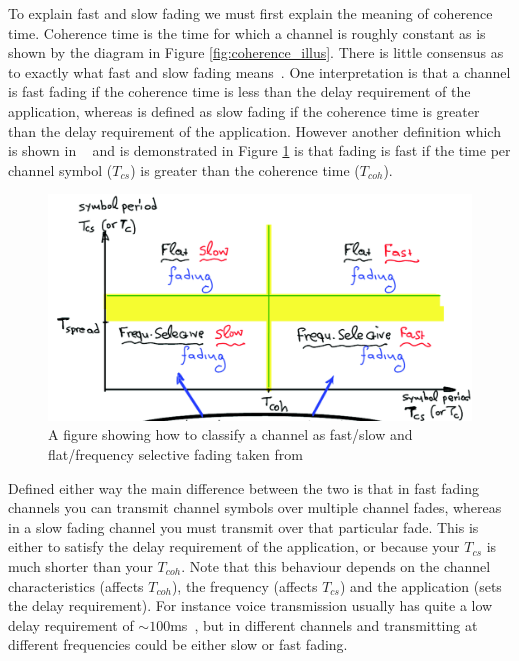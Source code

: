 \documentclass[12pt,onecolumn,letterpaper]{article}
\newcommand\genfigsize{0.5}
\begin{document}
To explain fast and slow fading we must first explain the meaning of coherence time. Coherence time is the time for which a channel is roughly constant as is shown by the diagram in Figure \ref{fig:coherence_illus}. There is little consensus as to exactly what fast and slow fading means~\cite{WirelessTextbookC2}. One interpretation is that a channel is fast fading if the coherence time is less than the delay requirement of the application, whereas is defined as slow fading if the coherence time is greater than the delay requirement of the application. However another definition which is shown in ~\cite{EE3CommsSystemsNotesL4} and is demonstrated in Figure \ref{fig:fast_slow_flat_freq_selec_fading} is that fading is fast if the time per channel symbol ($T_{cs}$) is greater than the coherence time ($T_{coh}$).

\begin{figure}[t]
   \centering
   \includegraphics[width=\genfigsize\linewidth]{figures/fast_slow_flat_freq_selec_fading.PNG}
   \caption{A figure showing how to classify a channel as fast/slow and flat/frequency selective fading taken from~\cite{EE3CommsSystemsNotesL4}}
\label{fig:fast_slow_flat_freq_selec_fading}
\end{figure}

Defined either way the main difference between the two is that in fast fading channels you can transmit channel symbols over multiple channel fades, whereas in a slow fading channel you must transmit over that particular fade. This is either to satisfy the delay requirement of the application, or because your $T_{cs}$ is much shorter than your $T_{coh}$. Note that this behaviour depends on the channel characteristics (affects $T_{coh}$), the frequency (affects $T_{cs}$) and the application (sets the delay requirement). For instance voice transmission usually has quite a low delay requirement of ${\sim}100$ms~\cite{WirelessTextbookC2}, but in different channels and transmitting at different frequencies could be either slow or fast fading.
\end{document}
